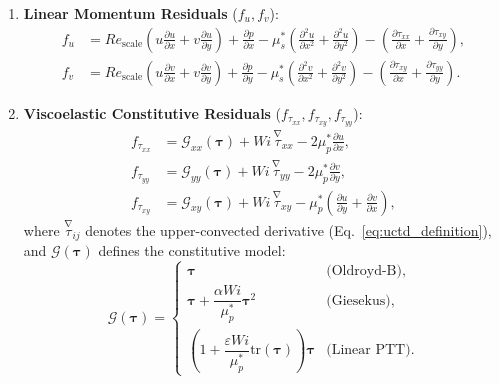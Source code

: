\begin{enumerate}
    \item \textbf{Linear Momentum Residuals} ($f_u, f_v$):
    \begin{align}
        f_u &= Re_{\mathrm{scale}} \left( u \frac{\partial u}{\partial x} + v \frac{\partial u}{\partial y} \right) + \frac{\partial p}{\partial x} - \mu_s^* \left( \frac{\partial^2 u}{\partial x^2} + \frac{\partial^2 u}{\partial y^2} \right) - \left( \frac{\partial \tau_{xx}}{\partial x} + \frac{\partial \tau_{xy}}{\partial y} \right) , \label{eq:residual_fu_explicit} \\
        f_v &= Re_{\mathrm{scale}} \left( u \frac{\partial v}{\partial x} + v \frac{\partial v}{\partial y} \right) + \frac{\partial p}{\partial y} - \mu_s^* \left( \frac{\partial^2 v}{\partial x^2} + \frac{\partial^2 v}{\partial y^2} \right) - \left( \frac{\partial \tau_{xy}}{\partial x} + \frac{\partial \tau_{yy}}{\partial y} \right) . \label{eq:residual_fv_explicit}
    \end{align}
    \item \textbf{Viscoelastic Constitutive Residuals}
        ($f_{\tau_{xx}}, f_{\tau_{xy}}, f_{\tau_{yy}}$):
    \begin{align}
        f_{\tau_{xx}} &= \mathcal{G}_{xx}(\boldsymbol{\tau}) + Wi \, \overset{\nabla}{\tau}_{xx} - 2\mu_p^* \frac{\partial u}{\partial x} , \label{eq:residual_ftxx_explicit} \\
        f_{\tau_{yy}} &= \mathcal{G}_{yy}(\boldsymbol{\tau}) + Wi \, \overset{\nabla}{\tau}_{yy} - 2\mu_p^* \frac{\partial v}{\partial y} , \label{eq:residual_ftyy_explicit} \\
        f_{\tau_{xy}} &= \mathcal{G}_{xy}(\boldsymbol{\tau}) + Wi \, \overset{\nabla}{\tau}_{xy} - \mu_p^* \left( \frac{\partial u}{\partial y} + \frac{\partial v}{\partial x} \right) , \label{eq:residual_ftxy_explicit}
    \end{align}
    where $\overset{\nabla}{\tau}_{ij}$ denotes the upper-convected derivative
    (Eq.~\eqref{eq:uctd_definition}), and $\boldsymbol{\mathcal{G}}(\boldsymbol{\tau})$
    defines the constitutive model:
    \begin{equation}
        \boldsymbol{\mathcal{G}}(\boldsymbol{\tau}) = 
        \begin{cases}
            \boldsymbol{\tau} & \text{(Oldroyd-B)}, \\[1ex]
            \boldsymbol{\tau} + \dfrac{\alpha Wi}{\mu_p^*} \boldsymbol{\tau}^2 & \text{(Giesekus)}, \\[1ex]
            \left(1 + \dfrac{\varepsilon Wi}{\mu_p^*} \text{tr}(\boldsymbol{\tau})\right) \boldsymbol{\tau} & \text{(Linear PTT)} .
        \end{cases}
        \label{eq:unified_constitutive_cases}
    \end{equation}
\end{enumerate}

